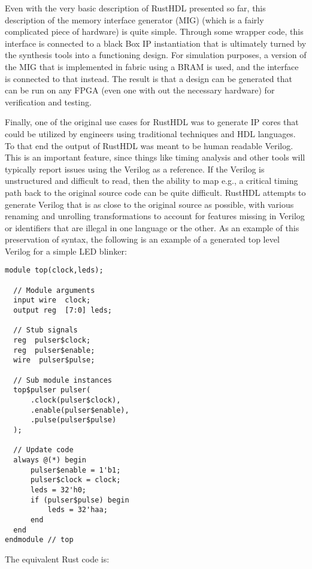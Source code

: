\documentclass[conference]{IEEEtran}
\begin{document}
Even with the very basic description of RustHDL presented so far, this description of the memory interface generator (MIG) (which is a
fairly complicated piece of hardware) is quite simple.   Through some wrapper code, this interface is connected to a black Box
IP instantiation that is ultimately turned by the synthesis tools into a functioning design.  For simulation purposes, a version 
of the MIG that is implemented in fabric using a BRAM is used, and the interface is connected to that instead.  The result is that
a design can be generated that can be run on any FPGA (even one with out the necessary hardware) for verification and testing.


Finally, one of the original use cases for RustHDL was to generate IP cores that could be utilized by engineers using traditional 
techniques and HDL languages.  To that end the output of RustHDL was meant to be human readable Verilog.  This is an important 
feature, since things like timing analysis and other tools will typically report issues using the Verilog as a reference.  If the
Verilog is unstructured and difficult to read, then the ability to map e.g., a critical timing path back to the original source 
code can be quite difficult.  RustHDL attempts to generate Verilog that is as close to the original source as possible, with 
various renaming and unrolling transformations to account for features missing in Verilog or identifiers that are illegal in 
one language or the other.  As an example of this preservation of syntax, the following is an example of a generated top level
Verilog for a simple LED blinker:

\begin{verbatim}
module top(clock,leds);
  
  // Module arguments
  input wire  clock;
  output reg  [7:0] leds;
  
  // Stub signals
  reg  pulser$clock;
  reg  pulser$enable;
  wire  pulser$pulse;
  
  // Sub module instances
  top$pulser pulser(
      .clock(pulser$clock),
      .enable(pulser$enable),
      .pulse(pulser$pulse)
  );
  
  // Update code
  always @(*) begin
      pulser$enable = 1'b1;
      pulser$clock = clock;
      leds = 32'h0;
      if (pulser$pulse) begin
          leds = 32'haa;
      end
  end  
endmodule // top
\end{verbatim}

The equivalent Rust code is:
\end{document}
